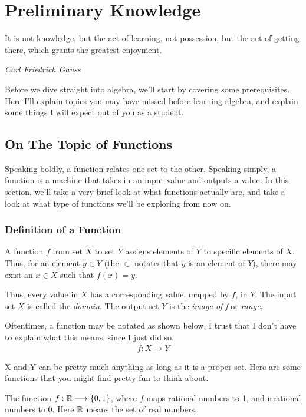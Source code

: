 \chapter{Preliminary Knowledge}
\epigraph{It is not knowledge, but the act of learning, not possession, but the act of getting there, which grants the greatest enjoyment.}{\textit{Carl Friedrich Gauss}}

Before we dive straight into algebra, we'll start by covering some prerequisites. Here I'll explain topics you may have missed before learning algebra, and explain some things I will expect out of you as a student. 

\section{On The Topic of Functions}

Speaking boldly, a function relates one set to the other. Speaking simply, a function is a machine that takes in an input value and outputs a value. In this section, we'll take a very brief look at what functions actually are, and take a look at what type of functions we'll be exploring from now on. 

\subsection{Definition of a Function}

\begin{definition}
A function $f$ from set $X$ to set $Y$ assigns elements of $Y$ to specific elements of $X$. Thus, for an element $y \in Y$ (the $\in$ notates that $y$ is an element of $Y$), there may exist an $x \in X$ such that $f(x) = y$. 
\end{definition}

Thus, every value in $X$ has a corresponding value, mapped by $f$, in $Y$. The input set $X$ is called the \textit{domain}. The output set $Y$ is the \textit{image of f} or \textit{range}.

Oftentimes, a function may be notated as shown below. I trust that I don't have to explain what this means, since I just did so.
\begin{align*}
    f: X \longrightarrow Y
\end{align*}

X and Y can be pretty much anything as long as it is a proper set. Here are some functions that you might find pretty fun to think about. 

\begin{example}
The function $f: \mathbb{R} \longrightarrow \{0, 1\}$, where $f$ maps rational numbers to 1, and irrational numbers to 0. Here $\mathbb{R}$ means the set of real numbers.
\end{example}

